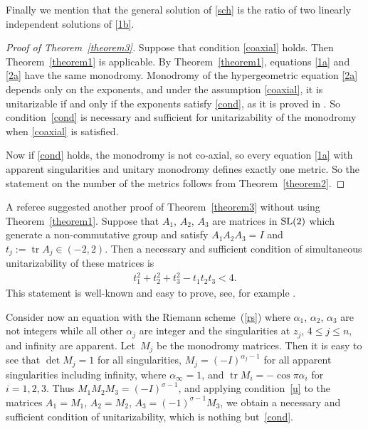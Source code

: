 \documentclass[pdftex]{sigma}
\numberwithin{equation}{section}
\def\tr{\operatorname{tr}}
\begin{document}
Finally we mention that the general solution of \eqref{sch} is the ratio of two linearly independent solutions of \eqref{1b}.

\begin{proof}[Proof of Theorem~\ref{theorem3}] Suppose that condition \eqref{coaxial} holds. Then Theorem~\ref{theorem1} is applicable. By Theorem~\ref{theorem1}, equations \eqref{1a} and \eqref{2a} have the same monodromy. Monodromy of the hypergeometric equation \eqref{2a} depends only on the exponents, and under the assumption \eqref{coaxial}, it is unitarizable if and only if the exponents satisfy \eqref{cond}, as it is proved in \cite{E, FKKRUY}. So condition~\eqref{cond} is necessary and sufficient for unitarizability
of the monodromy when \eqref{coaxial} is satisfied.

Now if \eqref{cond} holds, the monodromy is not co-axial, so every
equation \eqref{1a} with apparent singularities and unitary monodromy defines exactly one metric. So the statement on the number of the metrics follows from Theorem~\ref{theorem2}.
\end{proof}

\begin{Remark}
A referee suggested another proof of Theorem~\ref{theorem3} without using Theorem~\ref{theorem1}. Suppose that $A_1$, $A_2$, $A_3$ are matrices in ${\rm SL}(2)$ which generate a non-commutative group and satisfy $A_1A_2A_3=I$ and $t_j:=\tr A_j\in(-2,2)$. Then a necessary and sufficient condition of simultaneous unitarizability of these matrices is{\samepage
\begin{gather}\label{u}
t_1^2+t_2^2+t_3^2-t_1t_2t_3<4.
\end{gather}
This statement is well-known and easy to prove, see, for example \cite[Theorem~3.7]{BS}.}

Consider now an equation with the Riemann scheme~(\ref{rs}) where $\alpha_1$, $\alpha_2$, $\alpha_3$ are not integers while all other $\alpha_j$ are integer and the singularities at $z_j$, $4\leq j\leq n$, and infinity are apparent. Let~$M_j$ be the monodromy matrices. Then it is easy to see that $\det M_j=1$ for all singularities, $M_j=(-I)^{\alpha_j-1}$ for all apparent singularities including infinity, where $\alpha_\infty=1$, and $\tr M_i=-\cos\pi\alpha_i$ for $i=1,2,3$. Thus $M_1M_2M_3=(-I)^{\sigma-1}$, and applying condition~\eqref{u} to the matrices $A_1=M_1$, $A_2=M_2$, $A_3=(-1)^{\sigma-1}M_3$, we obtain a necessary and sufficient condition of unitarizability, which is nothing but~\eqref{cond}.
\end{Remark}
\end{document}
